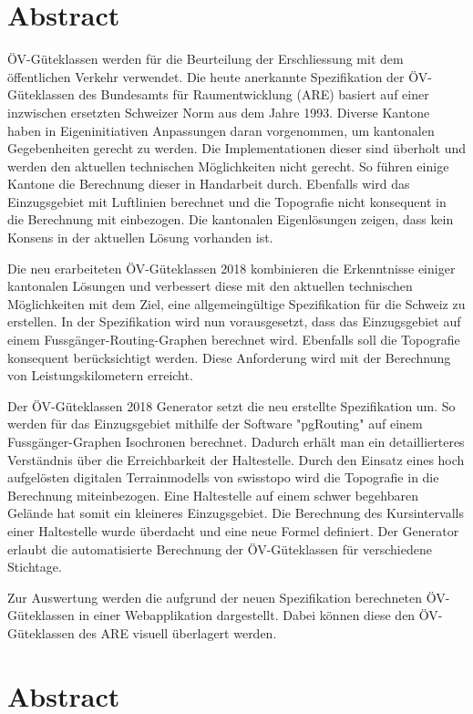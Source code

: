 
\chapter*{Abstract}
ÖV-Güteklassen werden für die Beurteilung der Erschliessung mit dem öffentlichen Verkehr verwendet.
Die heute anerkannte Spezifikation der ÖV-Güteklassen des Bundesamts für Raumentwicklung (ARE)  basiert auf einer inzwischen ersetzten Schweizer Norm aus dem Jahre 1993.
Diverse Kantone haben in Eigeninitiativen Anpassungen daran vorgenommen, um kantonalen Gegebenheiten gerecht zu werden.
Die Implementationen dieser sind überholt und werden den aktuellen technischen Möglichkeiten nicht gerecht.
So führen einige Kantone die Berechnung dieser in Handarbeit durch.
Ebenfalls wird das Einzugsgebiet mit Luftlinien berechnet und die Topografie nicht konsequent in die Berechnung mit einbezogen.
Die kantonalen Eigenlösungen zeigen, dass kein Konsens in der aktuellen Lösung vorhanden ist.

Die neu erarbeiteten ÖV-Güteklassen 2018 kombinieren die Erkenntnisse einiger kantonalen Lösungen und verbessert diese mit den aktuellen technischen Möglichkeiten mit dem Ziel, eine allgemeingültige Spezifikation für die Schweiz zu erstellen.
In der Spezifikation wird nun vorausgesetzt, dass das Einzugsgebiet auf einem Fussgänger-Routing-Graphen berechnet wird.
Ebenfalls soll die Topografie konsequent berücksichtigt werden.
Diese Anforderung wird mit der Berechnung von Leistungskilometern erreicht.

Der ÖV-Güteklassen 2018 Generator setzt die neu erstellte Spezifikation um.
So werden für das Einzugsgebiet mithilfe der Software "pgRouting" auf einem Fussgänger-Graphen Isochronen berechnet.
Dadurch erhält man ein detaillierteres Verständnis über die Erreichbarkeit der Haltestelle.
Durch den Einsatz eines hoch aufgelösten digitalen Terrainmodells von swisstopo wird die Topografie in die Berechnung miteinbezogen. Eine Haltestelle auf einem schwer begehbaren Gelände hat somit ein kleineres Einzugsgebiet.
Die Berechnung des Kursintervalls einer Haltestelle wurde überdacht und eine neue Formel definiert.
Der Generator erlaubt die automatisierte Berechnung der ÖV-Güteklassen für verschiedene Stichtage.

Zur Auswertung werden die aufgrund der neuen Spezifikation berechneten ÖV-Güteklassen in einer Webapplikation dargestellt.
Dabei können diese den ÖV-Güteklassen des ARE visuell überlagert werden.


\cleardoublepage

\chapter*{Abstract}

